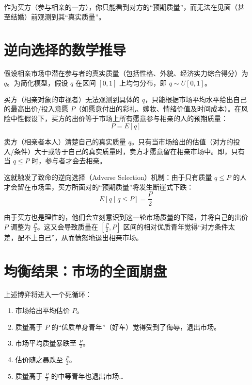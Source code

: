 \documentclass[11pt, a4paper, UTF8]{chinese-erj}
\begin{document}
作为买方（参与相亲的一方），你只能看到对方的“预期质量”，而无法在见面（甚至结婚）前观测到其“真实质量”。

\section{逆向选择的数学推导}

假设相亲市场中潜在参与者的真实质量（包括性格、外貌、经济实力综合得分）为 $q$。为简化模型，假设 $q$ 在区间 $[0, 1]$ 上均匀分布，即 $q \sim U[0, 1]$。

买方（相亲对象的审视者）无法观测到具体的 $q$，只能根据市场平均水平给出自己的最高出价/投入意愿 $P$（如愿意付出的彩礼、嫁妆、情绪价值及时间成本）。在风险中性假设下，买方的出价等于市场上所有愿意参与相亲的人的预期质量：
\begin{equation}
    P = E[q]
\end{equation}

卖方（相亲者本人）清楚自己的真实质量 $q$。只有当市场给出的估值（对方的投入/条件）大于或等于自己的真实质量时，卖方才愿意留在相亲市场中。即，只有当 $q \le P$ 时，参与者才会去相亲。

这就触发了致命的逆向选择（Adverse Selection）机制：由于只有质量 $q \le P$ 的人才会留在市场里，买方所面对的“预期质量”将发生断崖式下跌：
\begin{equation}
    E[q \mid q \le P] = \frac{P}{2}
\end{equation}

由于买方也是理性的，他们会立刻意识到这一轮市场质量的下降，并将自己的出价 $P$ 调整为 $\frac{P}{2}$。这又会导致质量在 $[\frac{P}{2}, P]$ 区间的相对优质青年觉得“对方条件太差，配不上自己”，从而愤怒地退出相亲市场。

\section{均衡结果：市场的全面崩盘}

上述博弈将进入一个死循环：
\begin{enumerate}
    \item 市场给出平均估价 $P$。
    \item 质量高于 $P$ 的“优质单身青年”（好车）觉得受到了侮辱，退出市场。
    \item 市场平均质量暴跌至 $\frac{P}{2}$。
    \item 估价随之暴跌至 $\frac{P}{2}$。
    \item 质量高于 $\frac{P}{2}$ 的中等青年也退出市场\dots
\end{enumerate}
\end{document}

